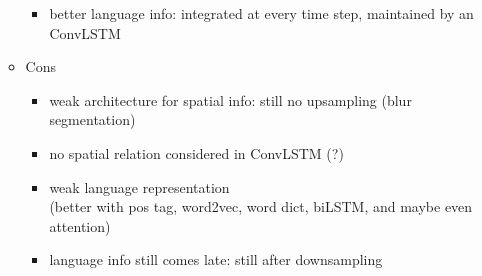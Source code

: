 \begin{itemize}
\begin{itemize}
\begin{itemize}
		\item better language info: integrated at every time step, maintained by an ConvLSTM
		\end{itemize}
	\item Cons
		\begin{itemize}
		\item weak architecture for spatial info: still no upsampling (blur segmentation)
		\item no spatial relation considered in ConvLSTM (?)
		\item weak language representation \\ 
		(better with pos tag, word2vec, word dict, biLSTM, and maybe even attention)
		\item language info still comes late: still after downsampling
		\end{itemize}
	\end{itemize}
\end{itemize}

